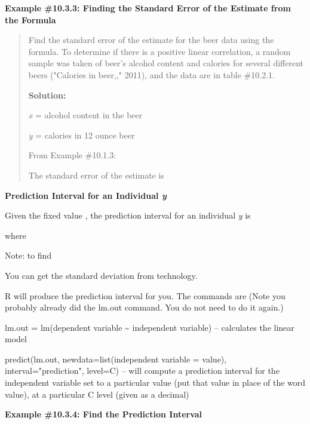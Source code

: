 \documentclass[]{book}
\begin{document}
\textbf{Example \#10.3.3: Finding the Standard Error of the Estimate from the Formula}

\begin{quote}
Find the standard error of the estimate for the beer data using the formula. To determine if there is a positive linear correlation, a random sample was taken of beer's alcohol content and calories for several different beers ("Calories in beer,," 2011), and the data are in table \#10.2.1.

\textbf{Solution:}

\emph{x} = alcohol content in the beer

\emph{y} = calories in 12 ounce beer

From Example \#10.1.3:

The standard error of the estimate is
\end{quote}

\textbf{Prediction Interval for an Individual \emph{y}}

Given the fixed value , the prediction interval for an individual \emph{y} is

where

Note: to find

You can get the standard deviation from technology.

R will produce the prediction interval for you. The commands are (Note you probably already did the lm.out command. You do not need to do it again.)

lm.out = lm(dependent variable \textasciitilde{} independent variable) -- calculates
the linear model

predict(lm.out, newdata=list(independent variable = value),
interval="prediction", level=C) -- will compute a prediction interval
for the independent variable set to a particular value (put that value
in place of the word value), at a particular C level (given as a
decimal)

\textbf{Example \#10.3.4: Find the Prediction Interval}
\end{document}
